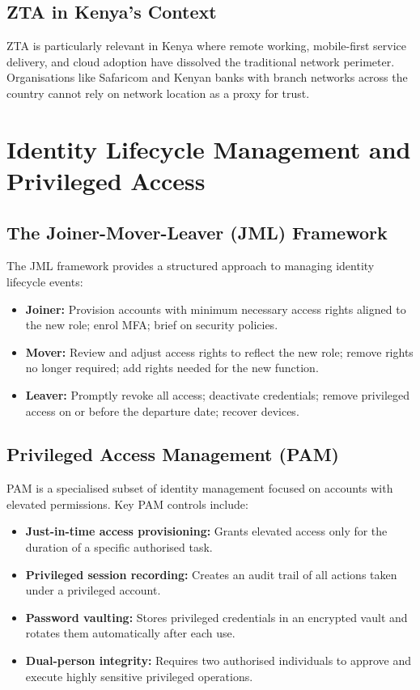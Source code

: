 \documentclass[12pt,a4paper]{article}
\begin{document}
\subsection{ZTA in Kenya's Context}

ZTA is particularly relevant in Kenya where remote working, mobile-first service delivery, and cloud adoption have dissolved the traditional network perimeter. Organisations like Safaricom and Kenyan banks with branch networks across the country cannot rely on network location as a proxy for trust.

\section{Identity Lifecycle Management and Privileged Access}

\subsection{The Joiner-Mover-Leaver (JML) Framework}

The JML framework provides a structured approach to managing identity lifecycle events:

\begin{itemize}
    \item \textbf{Joiner:} Provision accounts with minimum necessary access rights aligned to the new role; enrol MFA; brief on security policies.
    \item \textbf{Mover:} Review and adjust access rights to reflect the new role; remove rights no longer required; add rights needed for the new function.
    \item \textbf{Leaver:} Promptly revoke all access; deactivate credentials; remove privileged access on or before the departure date; recover devices.
\end{itemize}

\subsection{Privileged Access Management (PAM)}

PAM is a specialised subset of identity management focused on accounts with elevated permissions. Key PAM controls include:

\begin{itemize}
    \item \textbf{Just-in-time access provisioning:} Grants elevated access only for the duration of a specific authorised task.
    \item \textbf{Privileged session recording:} Creates an audit trail of all actions taken under a privileged account.
    \item \textbf{Password vaulting:} Stores privileged credentials in an encrypted vault and rotates them automatically after each use.
    \item \textbf{Dual-person integrity:} Requires two authorised individuals to approve and execute highly sensitive privileged operations.
\end{itemize}
\end{document}
